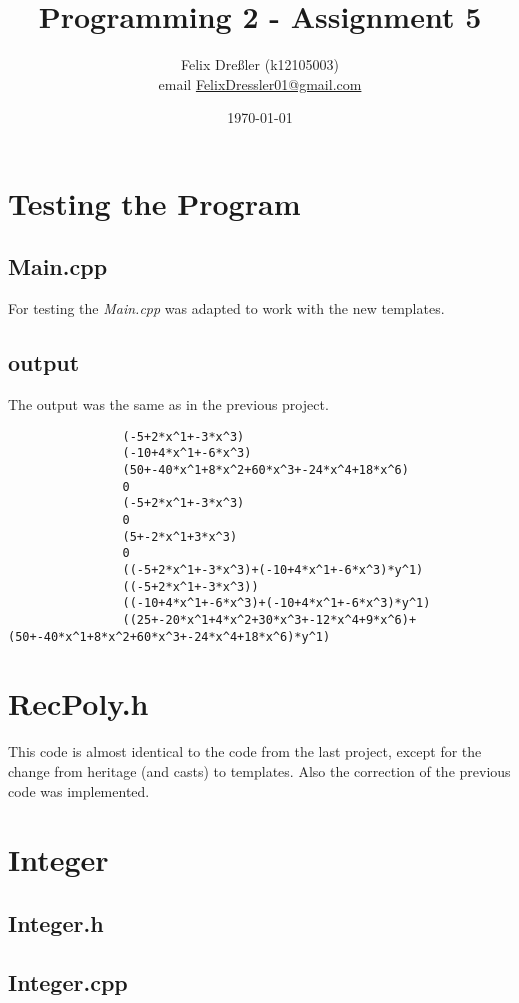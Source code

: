 \documentclass[11pt,titlepage]{article}
\title{Programming 2 - Assignment 5}
\author{Felix Dreßler (k12105003)\\ email \href{mailto:FelixDressler01@gmail.com}{FelixDressler01@gmail.com}}
\date{\today} %
\begin{document}
\maketitle
	
	\section{Testing the Program}
		\subsection{Main.cpp}
		For testing the \emph{Main.cpp} was adapted to work with the new templates.
			
		\subsection{output}
		The output was the same as in the previous project.
			\begin{lstlisting}
				(-5+2*x^1+-3*x^3)
				(-10+4*x^1+-6*x^3)
				(50+-40*x^1+8*x^2+60*x^3+-24*x^4+18*x^6)
				0
				(-5+2*x^1+-3*x^3)
				0
				(5+-2*x^1+3*x^3)
				0
				((-5+2*x^1+-3*x^3)+(-10+4*x^1+-6*x^3)*y^1)
				((-5+2*x^1+-3*x^3))
				((-10+4*x^1+-6*x^3)+(-10+4*x^1+-6*x^3)*y^1)
				((25+-20*x^1+4*x^2+30*x^3+-12*x^4+9*x^6)+(50+-40*x^1+8*x^2+60*x^3+-24*x^4+18*x^6)*y^1)
			\end{lstlisting}
	
\newpage	
	\section{RecPoly.h}
	This code is almost identical to the code from the last project, except for the change from heritage (and casts) to templates. Also the correction of the previous code was implemented.
	
			
	
\newpage	
	\section{Integer}
		\subsection{Integer.h}
			
		\subsection{Integer.cpp}
			
	
			
\end{document}
